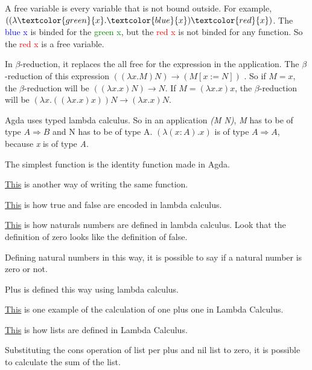   A free variable is every variable that is not bound outside.
  For example, $((\lambda\textcolor{green}{x}.\textcolor{blue}{x}) \textcolor{red}{x})$.
  The \textcolor{blue}{blue x} is binded for the \textcolor{green}{green x},
  but the \textcolor{red}{red x}
  is not binded for any function. So the \textcolor{red}{red x} is a free variable.

  In $\beta$-reduction, it replaces the all free for the expression in the application.
  The $\beta$-reduction of this expression $((\lambda x.M) N) \rightarrow (M[x := N])$ .
  So if $M = x$, the $\beta$-reduction will be $((\lambda x.x) N) \rightarrow N$.
  If $M = (\lambda x.x) x$, the $\beta$-reduction will be
  $(\lambda x.((\lambda x.x)x))N \rightarrow (\lambda x.x)N$.

  Agda uses typed lambda calculus.
  So in an application \emph{(M N)}, \emph{M} has to be of type $A \Rightarrow B$ and N has to be of type A.
  $(\lambda (x : A) . x)$ is of type $A \Rightarrow A$, because \emph{x} is of type \emph{A}.

  The simplest function is the identity function made in Agda.

  \hyperref[id2]{This} is another way of writing the same function.

  \hyperref[truefalse]{This} is how true and false are encoded in lambda calculus.

  \hyperref[naturals]{This} is how naturals numbers are defined in lambda calculus.
  Look that the definition of zero looks like the definition of false.

  Defining natural numbers in this way, it is possible to say if a natural number is zero or not.

  Plus is defined this way using lambda calculus.

  \hyperref[onepone]{This} is one example of the calculation of one plus one in Lambda Calculus.

  \hyperref[list]{This} is how lists are defined in Lambda Calculus.

  Substituting the cons operation of list per plus and nil list to zero, it is possible to calculate
  the sum of the list.

